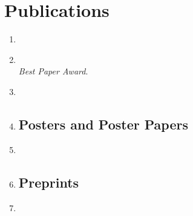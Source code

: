 \documentclass[10pt]{article}
\newcommand{\ignore}[1]{}
\begin{document}
\section*{Publications}
\begin{enumerate}
  
\subsection*{Journal and Conference Papers}

\item {}


\item {}\\
\textit{Best Paper Award}.

\item {}


\item {}

\subsection*{Posters and Poster Papers}

\item {}

\item {}

\subsection*{Preprints}

\item {}
\end{enumerate}

\ignore{
\section*{Extracurricular Activities}
\begin{itemize}

\item {\bf Association of Computing Machinery Student Chapter}\\
\quad Information Security (Cryptography) Group Leader

\item {\bf Upsilon Pi Epsilon}

\item {\bf UConn Mixed Martial Arts Club}\\
\quad Vice President, Treasurer
\end{itemize}
}
\end{document}
